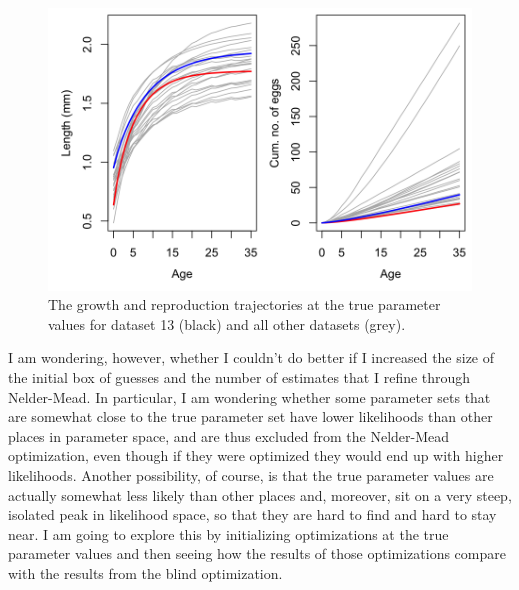 \documentclass[12pt,reqno,final,pdftex]{amsart}\usepackage[]{graphicx}\usepackage[]{color}
\newenvironment{knitrout}{}{} %
\theoremstyle{plain}
\numberwithin{equation}{part}
\begin{document}
\begin{knitrout}\scriptsize
{}\color{fgcolor}\begin{figure}

\includegraphics[width=\linewidth]{figure/comparing-trajectories-1} \hfill{}

\caption[The growth and reproduction trajectories at the true parameter values for dataset 13 (black) and all other datasets (grey)]{The growth and reproduction trajectories at the true parameter values for dataset 13 (black) and all other datasets (grey).}\label{fig:comparing-trajectories}
\end{figure}


\end{knitrout}


\clearpage

I am wondering, however, whether I couldn't do better if I increased the size of the initial box of guesses and the number of estimates that I refine through Nelder-Mead.
In particular, I am wondering whether some parameter sets that are somewhat close to the true parameter set have lower likelihoods than other places in parameter space, and are thus excluded from the Nelder-Mead optimization, even though if they were optimized they would end up with higher likelihoods.
Another possibility, of course, is that the true parameter values are actually somewhat less likely than other places and, moreover, sit on a very steep, isolated peak in likelihood space, so that they are hard to find and hard to stay near.
I am going to explore this by initializing optimizations at the true parameter values and then seeing how the results of those optimizations compare with the results from the blind optimization.
\end{document}
